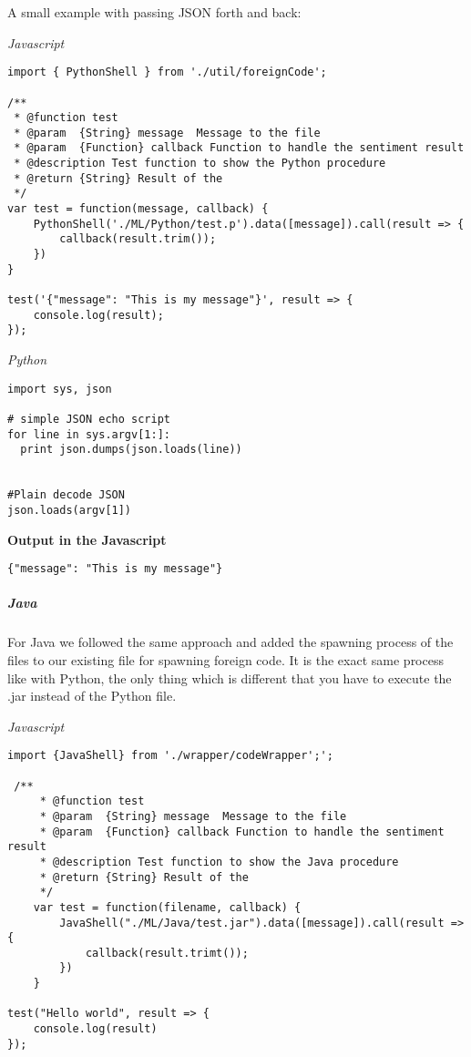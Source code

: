 \documentclass[]{article}
\let\oldsubparagraph\subparagraph
\renewcommand{\subparagraph}[1]{\oldsubparagraph{#1}\mbox{}}
\begin{document}
A small example with passing JSON forth and back:

\emph{Javascript}

\begin{verbatim}
import { PythonShell } from './util/foreignCode';

/**
 * @function test
 * @param  {String} message  Message to the file
 * @param  {Function} callback Function to handle the sentiment result
 * @description Test function to show the Python procedure
 * @return {String} Result of the 
 */
var test = function(message, callback) {
    PythonShell('./ML/Python/test.p').data([message]).call(result => {
        callback(result.trim());
    })
}

test('{"message": "This is my message"}', result => {
    console.log(result);
});

\end{verbatim}

\emph{Python}

\begin{verbatim}
import sys, json

# simple JSON echo script
for line in sys.argv[1:]:
  print json.dumps(json.loads(line))


#Plain decode JSON
json.loads(argv[1])
\end{verbatim}

\textbf{Output in the Javascript}

\begin{verbatim}
{"message": "This is my message"}
\end{verbatim}

\subparagraph{Java}\label{java}

For Java we followed the same approach and added the spawning process of
the files to our existing file for spawning foreign code. It is the
exact same process like with Python, the only thing which is different
that you have to execute the .jar instead of the Python file.

\emph{Javascript}

\begin{verbatim}
import {JavaShell} from './wrapper/codeWrapper';';

 /**
     * @function test
     * @param  {String} message  Message to the file
     * @param  {Function} callback Function to handle the sentiment result
     * @description Test function to show the Java procedure
     * @return {String} Result of the 
     */
    var test = function(filename, callback) {
        JavaShell("./ML/Java/test.jar").data([message]).call(result => {
            callback(result.trimt());
        })
    }
    
test("Hello world", result => {
    console.log(result)
});
\end{verbatim}
\end{document}

